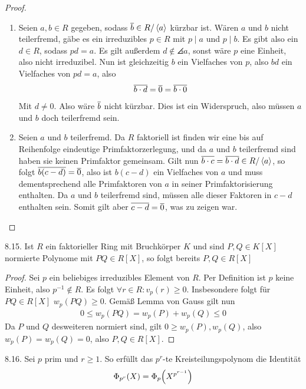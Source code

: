 \documentclass{article}
\newcommand{\ex}[1]{\tit{Übung} #1.}
\begin{document}
		\begin{proof}
			\begin{enumerate}
				\item Seien $a,b \in R$ gegeben, sodass $\overline{{b}} \in R / \left\langle a \right\rangle$ kürzbar ist. Wären $a$ und $b$ nicht teilerfremd, gäbe es ein irreduzibles $p \in R$ mit $p \mid a$ und $p \mid b$. Es gibt also ein $d \in R$, sodass $pd = a$. Es gilt außerdem $d \notin \angles{a}$, sonst wäre $p$ eine Einheit, also nicht irreduzibel. Nun ist gleichzeitig $b$ ein Vielfaches von $p$, also $bd$ ein Vielfaches von $pd = a$, also
				\begin{align*}
					\overline{{b \cdot d}} = \overline{{0}} = \overline{{b \cdot 0}}
				\end{align*}
				Mit $d \neq 0$. Also wäre $\overline{{b}}$ nicht kürzbar. Dies ist ein Widerspruch, also müssen $a$ und $b$ doch teilerfremd sein.
				\item Seien $a$ und $b$ teilerfremd. Da $R$ faktoriell ist finden wir eine bis auf Reihenfolge eindeutige Primfaktorzerlegung, und da $a$ und $b$ teilerfremd sind haben sie keinen Primfaktor gemeinsam. Gilt nun $\overline{{b \cdot c}} = \overline{{b \cdot d}} \in R/\left\langle a \right\rangle$, so folgt $\overline{{b(c-d)}} = \overline{{0}}$, also ist $b(c-d)$ ein Vielfaches von $a$ und muss dementsprechend alle Primfaktoren von $a$ in seiner Primfaktorisierung enthalten. Da $a$ und $b$ teilerfremd sind, müssen alle dieser Faktoren in $c-d$ enthalten sein. Somit gilt aber $\overline{{c-d}} = \overline{{0}}$, was zu zeigen war.
			\end{enumerate}
		\end{proof}
		\newpar
		\ex{8.15} Ist $R$ ein faktorieller Ring mit Bruchkörper $K$ und sind $P,Q \in K[X]$ normierte Polynome mit $PQ \in R[X]$, so folgt bereits $P, Q \in R[X]$
		\begin{proof}
			Sei $p$ ein beliebiges irreduzibles Element von $R$. Per Definition ist $p$ keine Einheit, also $p^{-1} \notin R$. Es folgt $\forall r \in R: v_p(r) \geq 0$. Insbesondere folgt für $PQ \in R[X]$ $w_p(PQ) \geq 0$.
			\newpar
			Gemäß Lemma von Gauss gilt nun
			\begin{align*}
				0 \leq w_p(PQ) = w_p(P) + w_p(Q) \leq 0
			\end{align*}
			Da $P$ und $Q$ desweiteren normiert sind, gilt $0 \geq w_p(P), w_p(Q)$, also $w_p(P) = w_p(Q) = 0$, also $P, Q \in R[X]$.
		\end{proof}
		\newpar
		\ex{8.16} Sei $p$ prim und $r \geq 1$. So erfüllt das $p^r$-te Kreisteilungspolynom die Identität
		\begin{align*}
			\Phi_{p^r}(X) = \Phi_p\qty(X^{p^{r-1}})
		\end{align*}
\end{document}
